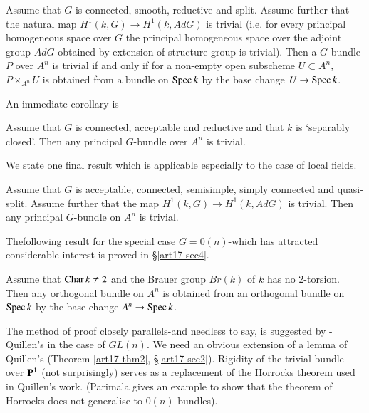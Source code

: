 \begin{alphtheorem}\label{art17-alphthmB}
Assume that $G$ is connected, smooth, reductive and split. Assume further that the natural map $H^1 (k,G) \to H^1 (k, AdG)$ is trivial (i.e. for every principal homogeneous space over $G$ the principal homogeneous space over the adjoint group $AdG$ obtained by extension of structure group is trivial). Then a $G$-bundle $P$ over $A^n$ is trivial if and only if for a non-empty open subscheme $U \subset A^n$, $P \times_{A^n} U$ is obtained from a bundle on $\operatorname{Spec} k$ by the base change $U \to \operatorname{Spec} k$.
\end{alphtheorem}

An immediate corollary is 

\begin{alphtheorem}\label{art17-alphthmC}
Assume that $G$ is connected, acceptable and reductive and that $k$ is `separably closed'. Then any principal $G$-bundle over $A^n$ is trivial. 
\end{alphtheorem}

We state one final result which is applicable especially to the case of local fields.

\begin{alphtheorem}\label{art17-alphthmD}
Assume that $G$ is acceptable, connected, semisimple, simply connected and quasi-split. Assume further that the map $H^1 (k,G) \to H^1 (k, AdG)$ is trivial. Then any principal $G$-bundle on $A^n$ is trivial.
\end{alphtheorem}

The\pageoriginale following result for the special case  $G = 0(n)$-which has attracted considerable interest-is proved in \S \ref{art17-sec4}.

\begin{alphtheorem}\label{art17-alphthmE}
Assume that $\operatorname{Char} k \neq 2$ and the Brauer group $Br (k)$ of $k$ has no 2-torsion. Then any orthogonal bundle on $A^n$ is obtained  from an orthogonal bundle on $\operatorname{Spec} k$ by the base change $A^n \to \operatorname{Spec} k$.
\end{alphtheorem}

The method of proof closely parallels-and needless to say, is suggested by - Quillen's in the case of $GL(n)$. We need an obvious  extension of a lemma of Quillen's (Theorem \ref{art17-thm2}, \S \ref{art17-sec2}). Rigidity of the trivial bundle over $\mathbf{P}^1$ (not surprisingly) serves as a replacement of the Horrocks theorem used in Quillen's work. (Parimala \cite{art17-key9} gives an example to show that the theorem of Horrocks does not generalise to $0(n)$-bundles).

